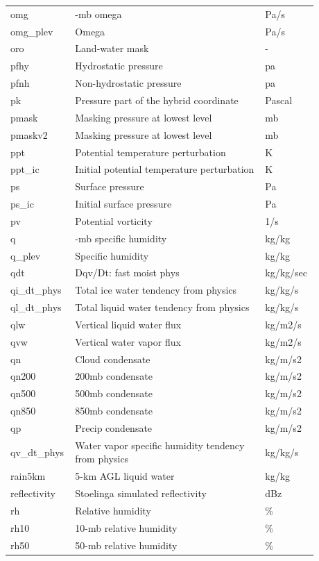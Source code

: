 \documentclass[11pt,fleqn]{report}              %
\begin{document}
\begin{enumerate}
\begin{enumerate}
{\begin{longtable}{p{0.17\linewidth} | p{0.6\linewidth} | p{0.11\linewidth} }
 omg & -mb omega & Pa/s \\
 omg\_plev & Omega & Pa/s \\
 oro & Land-water mask & - \\
 pfhy & Hydrostatic pressure & pa \\
 pfnh & Non-hydrostatic pressure & pa \\
 pk & Pressure part of the hybrid coordinate & Pascal \\
 pmask & Masking pressure at lowest level & mb \\
 pmaskv2 & Masking pressure at lowest level & mb \\
 ppt & Potential temperature perturbation & K \\
 ppt\_ic & Initial potential temperature perturbation & K \\
 ps & Surface pressure & Pa \\
 ps\_ic & Initial surface pressure & Pa \\
 pv & Potential vorticity & 1/s \\
 q & -mb specific humidity & kg/kg \\
 q\_plev & Specific humidity & kg/kg \\
 qdt & Dqv/Dt: fast moist phys & kg/kg/sec \\
 qi\_dt\_phys & Total ice water tendency from physics & kg/kg/s \\
 ql\_dt\_phys & Total liquid water tendency from physics & kg/kg/s \\ 
 qlw & Vertical liquid water flux & kg/m2/s \\
 qvw & Vertical water vapor flux & kg/m2/s \\
 qn & Cloud condensate & kg/m/s2 \\
 qn200 & 200mb condensate & kg/m/s2 \\
  qn500 & 500mb condensate & kg/m/s2 \\
  qn850 & 850mb condensate & kg/m/s2 \\ 
  qp & Precip condensate & kg/m/s2 \\
  qv\_dt\_phys & Water vapor specific humidity tendency from physics & kg/kg/s \\
  rain5km & 5-km AGL liquid water & kg/kg \\
  reflectivity & Stoelinga simulated reflectivity & dBz \\
  rh & Relative humidity & \% \\
  rh10 & 10-mb relative humidity & \% \\
  rh50 & 50-mb relative humidity & \% \\

\end{longtable}}
\end{enumerate}
\end{enumerate}
\end{document}
